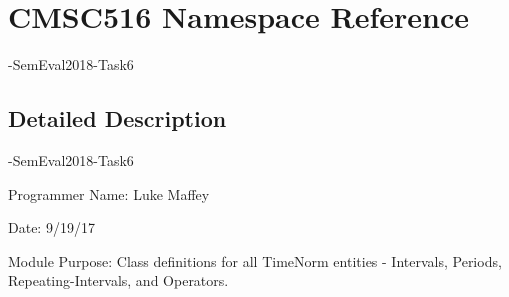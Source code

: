 \hypertarget{namespaceCMSC516}{}\section{C\+M\+S\+C516 Namespace Reference}
\label{namespaceCMSC516}


-\/\+Sem\+Eval2018-\/\+Task6  




\subsection{Detailed Description}
-\/\+Sem\+Eval2018-\/\+Task6 

Programmer Name\+: Luke Maffey

Date\+: 9/19/17

Module Purpose\+: Class definitions for all Time\+Norm entities -\/ Intervals, Periods, Repeating-\/\+Intervals, and Operators. 